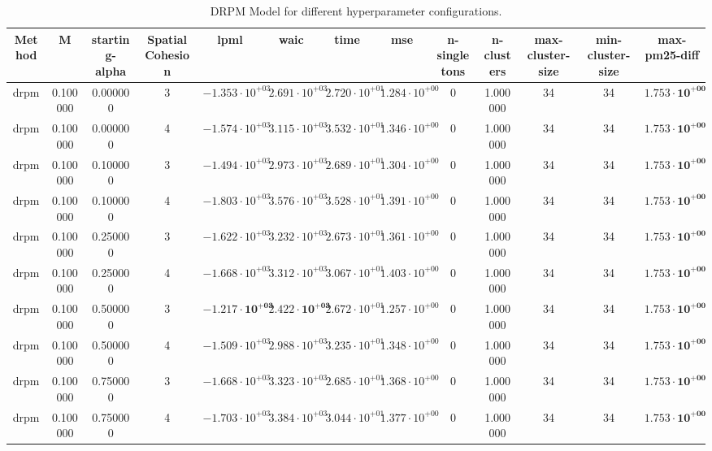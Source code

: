 \begin{table}
\caption{DRPM Model for different hyperparameter configurations.}
\begin{tabular}{ccccccccccccc}
\toprule
Method & M & starting-alpha & SpatialCohesion & lpml & waic & time & mse & n-singletons & n-clusters & max-cluster-size & min-cluster-size & max-pm25-diff \\
\midrule
drpm & 0.100000 & 0.000000 & 3 & $-1.353 \cdot 10^{+03}$ & $2.691 \cdot 10^{+03}$ & $2.720 \cdot 10^{+01}$ & $1.284 \cdot 10^{+00}$ & 0 & 1.000000 & 34 & 34 & $\mathbf{1.753 \cdot 10^{+00}}$ \\
drpm & 0.100000 & 0.000000 & 4 & $-1.574 \cdot 10^{+03}$ & $3.115 \cdot 10^{+03}$ & $3.532 \cdot 10^{+01}$ & $1.346 \cdot 10^{+00}$ & 0 & 1.000000 & 34 & 34 & $\mathbf{1.753 \cdot 10^{+00}}$ \\
drpm & 0.100000 & 0.100000 & 3 & $-1.494 \cdot 10^{+03}$ & $2.973 \cdot 10^{+03}$ & $2.689 \cdot 10^{+01}$ & $1.304 \cdot 10^{+00}$ & 0 & 1.000000 & 34 & 34 & $\mathbf{1.753 \cdot 10^{+00}}$ \\
drpm & 0.100000 & 0.100000 & 4 & $-1.803 \cdot 10^{+03}$ & $3.576 \cdot 10^{+03}$ & $3.528 \cdot 10^{+01}$ & $1.391 \cdot 10^{+00}$ & 0 & 1.000000 & 34 & 34 & $\mathbf{1.753 \cdot 10^{+00}}$ \\
drpm & 0.100000 & 0.250000 & 3 & $-1.622 \cdot 10^{+03}$ & $3.232 \cdot 10^{+03}$ & $2.673 \cdot 10^{+01}$ & $1.361 \cdot 10^{+00}$ & 0 & 1.000000 & 34 & 34 & $\mathbf{1.753 \cdot 10^{+00}}$ \\
drpm & 0.100000 & 0.250000 & 4 & $-1.668 \cdot 10^{+03}$ & $3.312 \cdot 10^{+03}$ & $3.067 \cdot 10^{+01}$ & $1.403 \cdot 10^{+00}$ & 0 & 1.000000 & 34 & 34 & $\mathbf{1.753 \cdot 10^{+00}}$ \\
drpm & 0.100000 & 0.500000 & 3 & $\mathbf{-1.217 \cdot 10^{+03}}$ & $\mathbf{2.422 \cdot 10^{+03}}$ & $2.672 \cdot 10^{+01}$ & $1.257 \cdot 10^{+00}$ & 0 & 1.000000 & 34 & 34 & $\mathbf{1.753 \cdot 10^{+00}}$ \\
drpm & 0.100000 & 0.500000 & 4 & $-1.509 \cdot 10^{+03}$ & $2.988 \cdot 10^{+03}$ & $3.235 \cdot 10^{+01}$ & $1.348 \cdot 10^{+00}$ & 0 & 1.000000 & 34 & 34 & $\mathbf{1.753 \cdot 10^{+00}}$ \\
drpm & 0.100000 & 0.750000 & 3 & $-1.668 \cdot 10^{+03}$ & $3.323 \cdot 10^{+03}$ & $2.685 \cdot 10^{+01}$ & $1.368 \cdot 10^{+00}$ & 0 & 1.000000 & 34 & 34 & $\mathbf{1.753 \cdot 10^{+00}}$ \\
drpm & 0.100000 & 0.750000 & 4 & $-1.703 \cdot 10^{+03}$ & $3.384 \cdot 10^{+03}$ & $3.044 \cdot 10^{+01}$ & $1.377 \cdot 10^{+00}$ & 0 & 1.000000 & 34 & 34 & $\mathbf{1.753 \cdot 10^{+00}}$ \\

\end{tabular}
\end{table}
